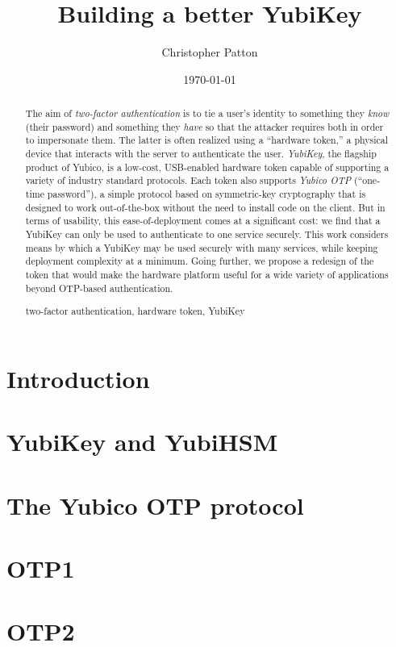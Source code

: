 \documentclass{build/llncs}
\date{\today}
\title{Building a better YubiKey}
\author{Christopher Patton}
\institute{University of Florida}
\begin{document}
\maketitle

\begin{abstract}
  The aim of \emph{two-factor authentication} is to tie a user's identity to
  something they \emph{know} (their password) and something they \emph{have} so
  that the attacker requires both in order to impersonate them.
  The latter is often realized using a ``hardware token,'' a physical device
  that interacts with the server to authenticate the user.
  \emph{YubiKey}, the flagship product of Yubico, is a low-cost, USB-enabled
  hardware token capable of supporting a variety of industry standard protocols.
  Each token also supports \emph{Yubico OTP} (``one-time password''), a simple
  protocol based on symmetric-key cryptography that is designed to work
  out-of-the-box without the need to install code on the client.
  But in terms of usability, this ease-of-deployment comes at a significant
  cost: we find that a YubiKey can only be used to authenticate to one service
  securely.
  This work considers means by which a YubiKey may be used securely with many
  services, while keeping deployment complexity at a minimum.
  Going further, we propose a redesign of the token that would
  make the hardware platform useful for a wide variety of applications beyond
  OTP-based authentication.
  \begin{keywords}
    two-factor authentication, hardware token, YubiKey
  \end{keywords}
\end{abstract}

\section{Introduction}


\section{YubiKey and YubiHSM}


\section{The Yubico OTP protocol}


\section{OTP1}


\section{OTP2}


\ifnum{}
 
 \else

\fi

\end{document}
